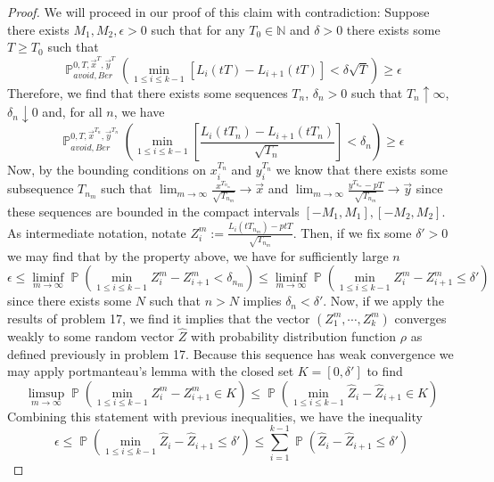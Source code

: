 \documentclass[12pt]{article}
\DeclareMathOperator{\pr}{\mathbb{P}}
\begin{document}
\begin{proof}
We will proceed in our proof of this claim with contradiction:
Suppose there exists $M_1,M_2,\epsilon>0$ such that for any $T_0\in \mathbb{N}$ and $\delta>0$ there exists some $T\geq T_0$ such that \[
\pr^{0,T,\vec x^T,\vec y^T}_{avoid, Ber}\left(\min_{1\leq i\leq k-1}\left[L_i(tT)-L_{i+1}(tT)\right]<\delta\sqrt{T}\right)\geq \epsilon
\]
Therefore, we find that there exists some sequences $T_n$, $\delta_n>0$  such that $T_n\uparrow \infty$, $\delta_n\downarrow 0$ and, for all $n$, we have  
\[
\pr^{0,T,\vec x^{T_n},\vec y^{T_n}}_{avoid, Ber}\left(\min_{1\leq i\leq k-1}\left[\frac{L_i(tT_n)-L_{i+1}(tT_n)}{\sqrt{T_n}}\right]<\delta_n\right)\geq \epsilon
\]
Now, by the bounding conditions on $x_i^{T_n}$ and $y_i^{T_n}$ we know that there exists some subsequence $T_{n_m}$ such that $\lim_{m\to\infty} \frac{x^{T_{n_m}}}{\sqrt{T_{n_m}}}\to \vec x$ 
and 
$\lim_{m\to\infty}\frac{y^{T_{n_m}}-pT}{\sqrt{T_{n_m}}}\to \vec y$ 
since these sequences are bounded in the compact intervals $[-M_1,M_1],[-M_2,M_2]$.
 As intermediate notation, notate $Z_i^m:=\frac{L_i(tT_{n_m})-ptT}{\sqrt{T_{n_m}}}$. Then, if we fix some $\delta'>0$ we may find that by the property above, we have for sufficiently large $n$
\[
\epsilon\leq \liminf_{m\to\infty}\pr\left(\min_{1\leq i\leq k-1}Z_i^m-Z_{i+1}^m<\delta_{n_m}\right)\leq \liminf_{m\to\infty}\pr\left(\min_{1\leq i\leq k-1}Z_i^m-Z_{i+1}^m\leq\delta'\right)
\]
since there exists some $N$ such that $n>N$ implies $\delta_n<\delta'$.
Now, if we apply the results of problem 17, we find it implies that the vector $(Z_1^m,\cdots, Z_k^m)$ converges weakly to some random vector $\hat Z$ with probability distribution function $\rho$ as defined previously in problem 17. 
Because this sequence has weak convergence we may apply portmanteau's lemma with the closed set $K=[0,\delta']$ to find 
\[\limsup_{m\to\infty }\pr\left(\min_{1\leq i\leq k-1}Z_i^m-Z_{i+1}^m\in K\right)\leq \pr\left(\min_{1\leq i\leq k-1}\hat Z_i-\hat Z_{i+1}\in K\right)
\]
Combining this statement with previous inequalities, we have the inequality
\begin{equation}\label{eq:ineq}
\epsilon\leq \pr\left(\min_{1\leq i\leq k-1} \hat Z_i-\hat Z_{i+1}\leq\delta'\right)\leq \sum_{i=1}^{k-1}\pr\left(\hat Z_i-\hat Z_{i+1}\leq \delta'\right)
\end{equation}


\end{proof}
\end{document}
